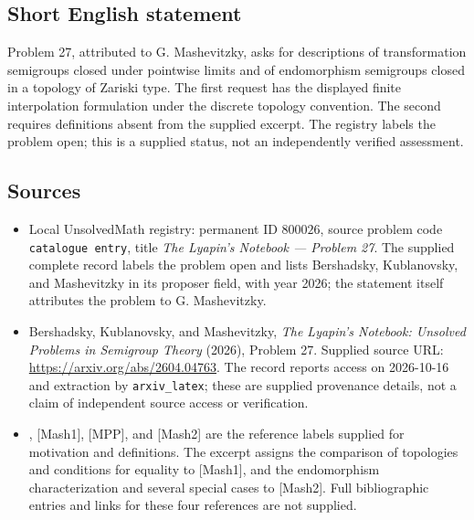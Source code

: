 \documentclass[11pt]{article}
\begin{document}
\subsection{Short English statement}
Problem 27, attributed to G. Mashevitzky, asks for descriptions of transformation semigroups closed under pointwise limits and of endomorphism semigroups closed in a topology of Zariski type. The first request has the displayed finite interpolation formulation under the discrete topology convention. The second requires definitions absent from the supplied excerpt. The registry labels the problem open; this is a supplied status, not an independently verified assessment.
\subsection{Sources}
\begin{itemize}
\item Local UnsolvedMath registry: permanent ID \(800026\), source problem code \texttt{catalogue entry}, title \emph{The Lyapin's Notebook --- Problem 27}. The supplied complete record labels the problem open and lists Bershadsky, Kublanovsky, and Mashevitzky in its proposer field, with year 2026; the statement itself attributes the problem to G. Mashevitzky.
\item Bershadsky, Kublanovsky, and Mashevitzky, \emph{The Lyapin's Notebook: Unsolved Problems in Semigroup Theory} (2026), Problem 27. Supplied source URL: \url{https://arxiv.org/abs/2604.04763}. The record reports access on 2026-10-16 and extraction by \texttt{arxiv\_latex}; these are supplied provenance details, not a claim of independent source access or verification.
\item [Cameron], [Mash1], [MPP], and [Mash2] are the reference labels supplied for motivation and definitions. The excerpt assigns the comparison of topologies and conditions for equality to [Mash1], and the endomorphism characterization and several special cases to [Mash2]. Full bibliographic entries and links for these four references are not supplied.
\end{itemize}
\end{document}
